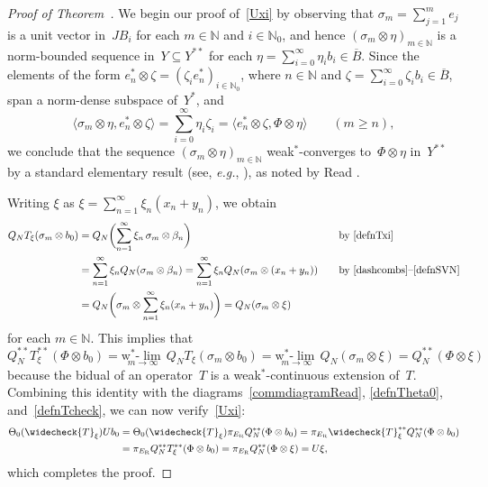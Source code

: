 \documentclass[12pt,reqno]{amsart}
\theoremstyle{definition}
\numberwithin{equation}{section}
\renewcommand{\ge}{\ensuremath{\geqslant}}
\newcommand{\N}{\mathbb{N}}
\begin{document}
\begin{proof}[Proof of Theorem~{\normalfont{\ref{WEBEsplitexact}}}]
We begin our proof of~\eqref{Uxi} by observing that $\sigma_m =
\sum_{j=1}^m e_j$ is a unit vector in~$JB_i$ for each $m\in\N$ and
$i\in\N_0$, and hence $(\sigma_m\otimes\eta)_{m\in\N}$ is a
norm-bounded sequence in~$Y\subseteq Y^{**}$ for each $\eta =
\sum_{i=0}^\infty\eta_i b_i\in\overline{B}$. Since the elements of the
form $e_n^*\otimes\zeta = (\zeta_ie_n^*)_{i\in\N_0}$, where $n\in\N$
and $\zeta = \sum_{i=0}^\infty\zeta_i b_i\in \overline{B}$, span a
norm-dense subspace of~$Y^*$, and
\[ \langle \sigma_m\otimes\eta, e_n^*\otimes\zeta\rangle = 
\sum_{i=0}^\infty\eta_i\zeta_i = \langle e_n^*\otimes\zeta,
\Phi\otimes\eta \rangle\qquad (m\ge n), \] we conclude that the
sequence $(\sigma_m\otimes\eta)_{m\in\N}$ weak$^*$-converges
to~$\Phi\otimes\eta$ in~$Y^{**}$ by a standard elementary result (see,
\emph{e.g.}, \cite[Exercise~3.3]{fabianetal}), as noted by Read
\cite[p.~315]{read}. 

Writing $\xi$ as $\xi = \sum_{n=1}^\infty\xi_n(x_n+y_n)$, we obtain
\begin{alignat*}{3} Q_N T_\xi(\sigma_m\otimes b_0) &= Q_N\biggl(\sum_{n=1}^\infty
  \xi_n\,\sigma_m\otimes\beta_n\biggr)
  &\quad&\text{by~\eqref{defnTxi}}\\ &= \sum_{n=1}^\infty \xi_n
  Q_N(\sigma_m\otimes\beta_n) = \sum_{n=1}^\infty \xi_n
  Q_N(\sigma_m\otimes(x_n+y_n))
  &\quad&\text{by~\eqref{dashcombs}--\eqref{defnSVN}}\\ &=
  Q_N\biggl(\sigma_m\otimes\sum_{n=1}^\infty \xi_n(x_n+y_n)\biggr) =
  Q_N(\sigma_m\otimes\xi)
\end{alignat*}
for each $m\in\N$. This implies that
\[ Q_N^{**}T_\xi^{**}(\Phi\otimes b_0) =
\underset{m\to\infty}{\text{w}^*\text{-}\lim}\,Q_N
T_\xi(\sigma_m\otimes b_0) =
\underset{m\to\infty}{\text{w}^*\text{-}\lim}\,
Q_N(\sigma_m\otimes\xi) = Q_N^{**}(\Phi\otimes\xi) \] because the
bidual of an operator~$T$ is a weak$^*$-continuous extension of~$T$.
Combining this identity with the diagrams~\eqref{commdiagramRead},
\eqref{defnTheta0}, and~\eqref{defnTcheck}, we can now
verify~\eqref{Uxi}:
\begin{align*} 
\Theta_0(\widecheck{T}_\xi)Ub_0 &=
\Theta_0(\widecheck{T}_\xi)\pi_{E_\text{R}}Q_N^{**}(\Phi\otimes b_0) =
\pi_{E_\text{R}}\widecheck{T}_\xi^{**}Q_N^{**}(\Phi\otimes b_0)\\ &=
\pi_{E_\text{R}}Q_N^{**}T_\xi^{**}(\Phi\otimes b_0) =
\pi_{E_\text{R}}Q_N^{**}(\Phi\otimes\xi) = U\xi,
\end{align*}
which completes the proof.
\end{proof}
\end{document}
